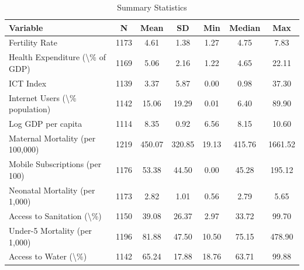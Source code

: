 \begin{table}

\caption{\label{tab:tab:summary_stats}Summary Statistics}
\centering
\begin{tabular}[t]{lcccccc}
\toprule
Variable & N & Mean & SD & Min & Median & Max\\
\midrule
Fertility Rate & 1173 & 4.61 & 1.38 & 1.27 & 4.75 & 7.83\\
Health Expenditure (\textbackslash{}\% of GDP) & 1169 & 5.06 & 2.16 & 1.22 & 4.65 & 22.11\\
ICT Index & 1139 & 3.37 & 5.87 & 0.00 & 0.98 & 37.30\\
Internet Users (\textbackslash{}\% population) & 1142 & 15.06 & 19.29 & 0.01 & 6.40 & 89.90\\
Log GDP per capita & 1114 & 8.35 & 0.92 & 6.56 & 8.15 & 10.60\\
\addlinespace
Maternal Mortality (per 100,000) & 1219 & 450.07 & 320.85 & 19.13 & 415.76 & 1661.52\\
Mobile Subscriptions (per 100) & 1176 & 53.38 & 44.50 & 0.00 & 45.28 & 195.12\\
Neonatal Mortality (per 1,000) & 1173 & 2.82 & 1.01 & 0.56 & 2.79 & 5.65\\
Access to Sanitation (\textbackslash{}\%) & 1150 & 39.08 & 26.37 & 2.97 & 33.72 & 99.70\\
Under-5 Mortality (per 1,000) & 1196 & 81.88 & 47.50 & 10.50 & 75.15 & 478.90\\
\addlinespace
Access to Water (\textbackslash{}\%) & 1142 & 65.24 & 17.88 & 18.76 & 63.71 & 99.88\\
\bottomrule
\end{tabular}
\end{table}
